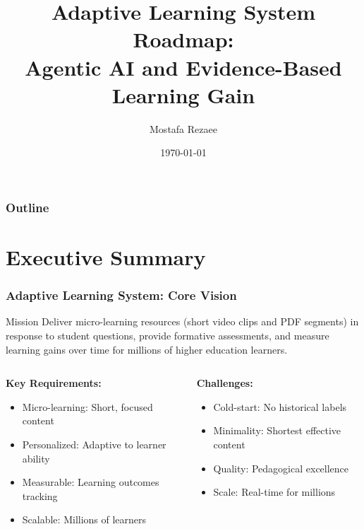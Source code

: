 \documentclass[aspectratio=169]{beamer}
\title{Adaptive Learning System Roadmap:\\Agentic AI and Evidence-Based Learning Gain}
\author{Mostafa Rezaee}
\institute{Pearson Company\\Manager: Hamid Bagheri}
\date{\today}
\begin{document}
\begin{frame}
\titlepage
\end{frame}

\begin{frame}
\frametitle{Outline}
\tableofcontents
\end{frame}

\section{Executive Summary}

\begin{frame}
\frametitle{Adaptive Learning System: Core Vision}
\begin{block}{Mission}
Deliver micro-learning resources (short video clips and PDF segments) in response to student questions, provide formative assessments, and measure learning gains over time for millions of higher education learners.
\end{block}

\begin{columns}
\begin{column}{0.5\textwidth}
\textbf{Key Requirements:}
\begin{itemize}
\item \textcolor{myblue}{Micro-learning:} Short, focused content
\item \textcolor{mygreen}{Personalized:} Adaptive to learner ability
\item \textcolor{mypurple}{Measurable:} Learning outcomes tracking
\item \textcolor{myorange}{Scalable:} Millions of learners
\end{itemize}
\end{column}
\begin{column}{0.5\textwidth}
\textbf{Challenges:}
\begin{itemize}
\item \textcolor{myred}{Cold-start:} No historical labels
\item \textcolor{myred}{Minimality:} Shortest effective content
\item \textcolor{myred}{Quality:} Pedagogical excellence
\item \textcolor{myred}{Scale:} Real-time for millions
\end{itemize}
\end{column}
\end{columns}
\end{frame}
\end{document}
